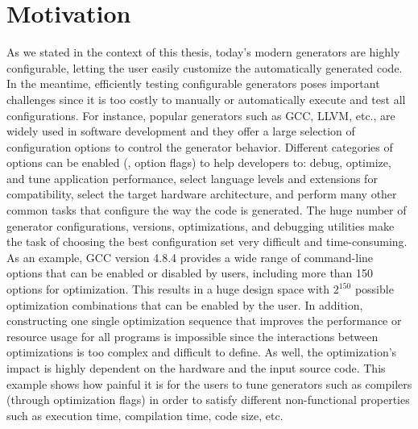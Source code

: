 \section{Motivation}


As we stated in the context of this thesis, today's modern generators are highly configurable, letting the user easily customize the automatically generated code. In the meantime, efficiently testing configurable generators poses important challenges since it is too costly to manually or automatically execute and test all configurations. 
For instance, popular generators such as GCC, LLVM, etc., are widely used in software development and they
offer a large selection of configuration options to control the generator behavior. 
Different categories of options can be enabled (\ie, option flags) to help developers to: debug, optimize, and tune application performance, select language levels and extensions for compatibility, select the target hardware architecture, and perform many other common tasks that configure the way the code is generated.
The huge number of generator configurations, versions, optimizations, and debugging utilities make the task of choosing the best configuration set very difficult and time-consuming. As an example, GCC version 4.8.4 provides a wide range of command-line options that can be enabled or disabled by users, including more than 150 options for optimization. This results in a huge design space with $2^{150}$ possible optimization combinations that can be enabled by the user. In addition, constructing one single optimization sequence that improves the performance or resource usage for all programs is impossible since the interactions between optimizations is too complex and difficult to define. As well, the optimization's impact is highly dependent on the hardware and the input source code.
This example shows how painful it is for the users to tune generators such as compilers (through optimization flags) in order to satisfy different non-functional properties such as execution time, compilation time, code size, etc.

